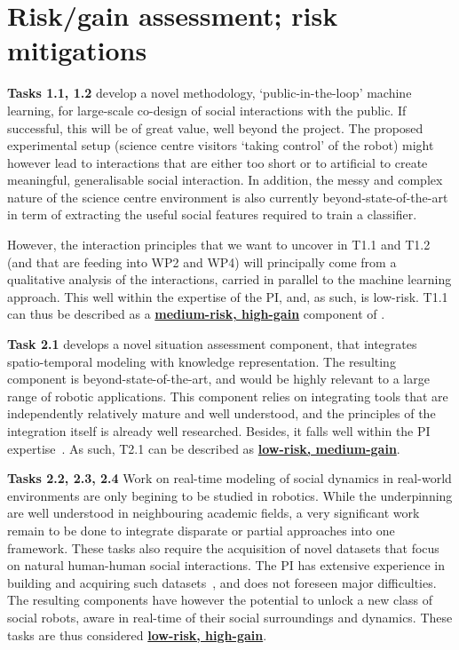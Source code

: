 
\section{Risk/gain assessment; risk mitigations}\label{risks}

\textbf{Tasks 1.1, 1.2} develop a novel methodology, `public-in-the-loop' machine
learning, for large-scale co-design of social interactions with the public. If
successful, this will be of great value, well beyond the project. The
proposed experimental setup (science centre visitors `taking control' of the robot)
might however lead to interactions that are either too short or to artificial to
create meaningful, generalisable social interaction. In addition, the messy and
complex nature of the science centre environment is also currently beyond-state-of-the-art
in term of extracting the useful social features required to train a classifier.

However, the interaction principles that we want to uncover in T1.1 and T1.2
(and that are feeding into WP2 and WP4) will principally come from a qualitative
analysis of the interactions, carried in parallel to the machine learning
approach. This well within the expertise of the PI, and, as such, is low-risk.
T1.1 can thus be described as a \ul{\bf medium-risk, high-gain} component of
\project.

\vspace{1em}

\textbf{Task 2.1} develops a novel situation assessment component, that
integrates spatio-temporal modeling with knowledge representation. The resulting
component is beyond-state-of-the-art, and would be highly relevant to a large range
of robotic applications. This component relies on integrating tools that are
independently relatively mature and well understood, and the principles of the
integration itself is already well researched. Besides, it falls well within the
PI
expertise~\parencite{lemaignan2018underworlds,sallami2019simulation,lemaignan2010oro}.
As such, T2.1 can be described as \ul{\bf low-risk, medium-gain}.

\textbf{Tasks 2.2, 2.3, 2.4} Work on real-time modeling of social dynamics in
real-world environments are only begining to be studied in robotics. While the
underpinning are well understood in neighbouring academic fields, a very
significant work remain to be done to integrate disparate or partial approaches
into one framework. These tasks also require the acquisition of novel datasets
that focus on natural human-human social interactions. The PI has extensive
experience in building and acquiring such
datasets~\parencite{lemaignan2018pinsoro,sallami2020unexpected}, and does not
foreseen major difficulties. The resulting components have however the potential
to unlock a new class of social robots, aware in real-time of their social
surroundings and dynamics.  These tasks are thus considered \ul{\bf low-risk,
high-gain}.

